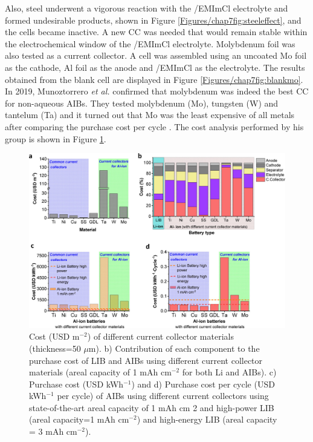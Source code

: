 Also, steel underwent a vigorous reaction with the /EMImCl electrolyte and formed undesirable products, shown in Figure \ref{Figures/chap7fig:steeleffect}, and the cells became inactive. A new CC was needed that would remain stable within the electrochemical window of the /EMImCl electrolyte. Molybdenum foil was also tested as a current collector. A cell was assembled using an uncoated Mo foil as the cathode, Al foil as the anode and /EMImCl as the electrolyte. The results obtained from the blank cell are displayed in Figure \ref{Figures/chap7fig:blankmo}. In 2019, Munoztorrero \textit{et al.} confirmed that molybdenum was indeed the best CC for non-aqueous AIBs. They tested molybdenum (Mo), tungsten (W) and tantelum (Ta) and it turned out that Mo was the least expensive of all metals after comparing the purchase cost per cycle \cite{munoztorrero_unexpected_2019}. The cost analysis performed by his group is shown in Figure \ref{Figures/chap7fig:goodmo}.
\begin{figure}[tbh!]
\centering
\includegraphics[width=\textwidth]{Figures/chap7fig/goodmo}
\caption{Cost (USD m$^{-2}$) of different current collector materials (thickness=50 $\mu$m). b) Contribution of each component to the purchase cost of LIB and AIBs using different current collector materials (areal capacity of 1 mAh cm$^{-2}$ for both Li and AIBs). c) Purchase cost (USD kWh$^{-1}$) and d) Purchase cost per cycle (USD kWh$^{-1}$ per cycle) of AIBs using different current collectors using state-of-the-art areal capacity of 1 mAh cm 2 and high-power LIB (areal capacity=1 mAh cm$^{-2}$) and high-energy LIB (areal capacity = 3 mAh cm$^{-2}$). }
\label{Figures/chap7fig:goodmo}
\end{figure}

